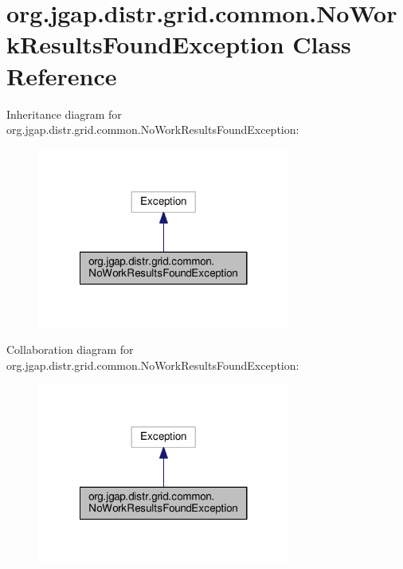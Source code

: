 \hypertarget{classorg_1_1jgap_1_1distr_1_1grid_1_1common_1_1_no_work_results_found_exception}{\section{org.\-jgap.\-distr.\-grid.\-common.\-No\-Work\-Results\-Found\-Exception Class Reference}
\label{classorg_1_1jgap_1_1distr_1_1grid_1_1common_1_1_no_work_results_found_exception}
}


Inheritance diagram for org.\-jgap.\-distr.\-grid.\-common.\-No\-Work\-Results\-Found\-Exception\-:
\nopagebreak
\begin{figure}[H]
\begin{center}
\leavevmode
\includegraphics[width=236pt]{classorg_1_1jgap_1_1distr_1_1grid_1_1common_1_1_no_work_results_found_exception__inherit__graph}
\end{center}
\end{figure}


Collaboration diagram for org.\-jgap.\-distr.\-grid.\-common.\-No\-Work\-Results\-Found\-Exception\-:
\nopagebreak
\begin{figure}[H]
\begin{center}
\leavevmode
\includegraphics[width=236pt]{classorg_1_1jgap_1_1distr_1_1grid_1_1common_1_1_no_work_results_found_exception__coll__graph}
\end{center}
\end{figure}
